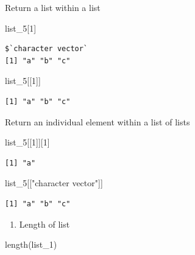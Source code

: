 \documentclass[
  letterpaper,
  DIV=11,
  numbers=noendperiod]{scrreprt}
\newenvironment{Shaded}{\begin{snugshade}}{\end{snugshade}}
\newcommand{\DecValTok}[1]{\textcolor[rgb]{0.68,0.00,0.00}{#1}}
\newcommand{\FunctionTok}[1]{\textcolor[rgb]{0.28,0.35,0.67}{#1}}
\newcommand{\NormalTok}[1]{\textcolor[rgb]{0.00,0.23,0.31}{#1}}
\newcommand{\StringTok}[1]{\textcolor[rgb]{0.13,0.47,0.30}{#1}}
\providecommand{\tightlist}{%
  \setlength{\itemsep}{0pt}\setlength{\parskip}{0pt}}\usepackage{longtable,booktabs,array}
\begin{document}
Return a list within a list

\begin{Shaded}
\begin{Highlighting}[]
\NormalTok{list\_5[}\DecValTok{1}\NormalTok{]}
\end{Highlighting}
\end{Shaded}

\begin{verbatim}
$`character vector`
[1] "a" "b" "c"
\end{verbatim}

\begin{Shaded}
\begin{Highlighting}[]
\NormalTok{list\_5[[}\DecValTok{1}\NormalTok{]]}
\end{Highlighting}
\end{Shaded}

\begin{verbatim}
[1] "a" "b" "c"
\end{verbatim}

Return an individual element within a list of lists

\begin{Shaded}
\begin{Highlighting}[]
\NormalTok{list\_5[[}\DecValTok{1}\NormalTok{]][}\DecValTok{1}\NormalTok{]}
\end{Highlighting}
\end{Shaded}

\begin{verbatim}
[1] "a"
\end{verbatim}

\begin{Shaded}
\begin{Highlighting}[]
\NormalTok{list\_5[[}\StringTok{"character vector"}\NormalTok{]]}
\end{Highlighting}
\end{Shaded}

\begin{verbatim}
[1] "a" "b" "c"
\end{verbatim}

\begin{enumerate}
\def\labelenumi{\alph{enumi}.}
\setcounter{enumi}{7}
\tightlist
\item
  Length of list
\end{enumerate}

\begin{Shaded}
\begin{Highlighting}[]
\FunctionTok{length}\NormalTok{(list\_1)}
\end{Highlighting}
\end{Shaded}
\end{document}
